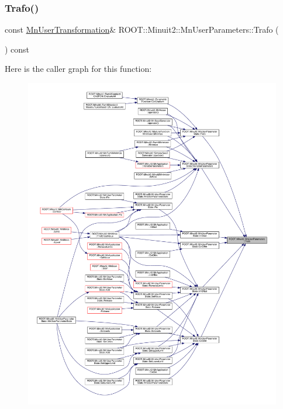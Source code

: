 \subsubsection{\texorpdfstring{Trafo()}{Trafo()}\hspace{0.1cm}{\footnotesize\ttfamily [2/2]}}
{\footnotesize\ttfamily const \mbox{\hyperlink{classROOT_1_1Minuit2_1_1MnUserTransformation}{Mn\+User\+Transformation}}\& R\+O\+O\+T\+::\+Minuit2\+::\+Mn\+User\+Parameters\+::\+Trafo (\begin{DoxyParamCaption}{ }\end{DoxyParamCaption}) const\hspace{0.3cm}{\ttfamily [inline]}}

Here is the caller graph for this function\+:\nopagebreak
\begin{figure}[H]
\begin{center}
\leavevmode
\includegraphics[width=350pt]{d6/d10/classROOT_1_1Minuit2_1_1MnUserParameters_ac5c3bff96b6fc41a790005f524e334db_icgraph}
\end{center}
\end{figure}
\mbox{\label{classROOT_1_1Minuit2_1_1MnUserParameters_a5084b0d1312ddb87609ff726a11fd7f6}} 
